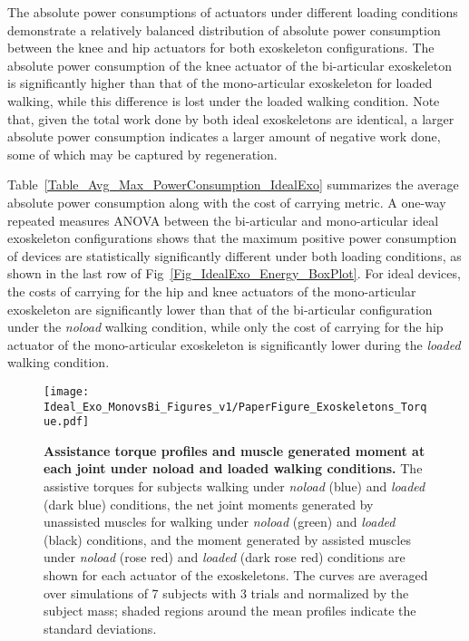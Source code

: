 \documentclass[10pt,letterpaper]{article}
\begin{document}
The absolute power consumptions of actuators under different loading conditions demonstrate a relatively balanced distribution of absolute power consumption between the knee and hip  actuators for both exoskeleton configurations. The absolute power consumption of the knee actuator of the bi-articular exoskeleton is significantly higher than that of the mono-articular exoskeleton for loaded walking, while this difference is lost under the loaded walking condition. Note that, given the total work done by both ideal exoskeletons are identical, a larger absolute power consumption indicates a larger amount of negative work done, some of which may be captured by regeneration.


Table~\ref{Table_Avg_Max_PowerConsumption_IdealExo} summarizes the average absolute power consumption along with the cost of carrying metric.
A one-way repeated measures ANOVA between the bi-articular and mono-articular ideal exoskeleton configurations shows that the maximum positive power consumption of devices are statistically significantly different under both loading conditions, as shown in the last row of Fig~\ref{Fig_IdealExo_Energy_BoxPlot}. For ideal devices, the costs of carrying for the hip and knee actuators of the mono-articular exoskeleton are significantly lower than that of the bi-articular configuration under the \emph{noload} walking condition, while only the cost of carrying for the hip actuator of the mono-articular exoskeleton is significantly lower during the \emph{loaded}  walking condition.

\begin{figure*}[ht]
	\centering
	\texttt{[image: Ideal\_Exo\_MonovsBi\_Figures\_v1/PaperFigure\_Exoskeletons\_Torque.pdf]}
	\vspace{-3mm}
	\caption{{\small\textbf{Assistance torque profiles and muscle generated moment at each joint under noload and loaded walking conditions.} The assistive torques for subjects walking under \textit{noload} (blue) and \textit{loaded}  (dark blue) conditions, the net joint moments generated by unassisted muscles for walking under \textit{noload} (green) and \textit{loaded} (black) conditions, and the moment generated  by assisted muscles under \textit{noload} (rose red) and \textit{loaded} (dark rose red) conditions are shown for each actuator of the exoskeletons. The curves are averaged over simulations of 7 subjects with 3 trials and normalized by the subject mass; shaded regions around the mean profiles indicate the standard deviations.}}
	\label{Fig_IdealExo_Torque}
\end{figure*} %
\end{document}
